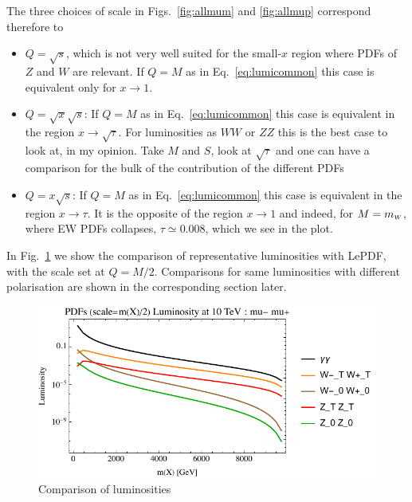 \documentclass[a4paper,11pt]{article}
\begin{document}
The three choices of scale in Figs.~\ref{fig:allmum} and \ref{fig:allmup} correspond therefore to 

\begin{itemize}
\item $Q=\sqrt{s}$, which is not very well suited for the small-$x$ region where PDFs of $Z$ and $W$ are relevant. If $Q=M$ as in Eq.~\eqref{eq:lumicommon} this case is equivalent only for $x\to 1$.
\item$Q=\sqrt{x} \sqrt{s}$: If $Q=M$ as in Eq.~\eqref{eq:lumicommon} this case is equivalent in the region $x\to \sqrt{\tau}$. For luminosities as $WW$ or $ZZ$ this is the best case to look at, in my opinion. Take $M$ and $S$, look at $\sqrt{\tau}$ and one can have a comparison for the bulk of the contribution of the different PDFs
\item $Q=x \sqrt{s}$: If $Q=M$ as in Eq.~\eqref{eq:lumicommon} this case is equivalent in the region $x \to \tau$. It is the opposite of the region $x\to 1$ and indeed, for $M=m_{\scriptscriptstyle W}$, where EW PDFs collapses, $\tau \simeq 0.008$, which we see in the plot.    
\end{itemize}


In Fig.~\ref{fig:lumicomparison} we show the comparison of representative luminosities with {\small \sc LePDF}, with the scale set at $Q=M/2$.
Comparisons for same luminosities with different polarisation are shown in the corresponding section later.



\begin{figure}
\includegraphics[width=0.9\linewidth]{Notebooks/PlotLumi/10TeV/lumis/plotgammaWZ.pdf} 
\caption{Comparison of luminosities \label{fig:lumicomparison}}
\end{figure}
\end{document}

